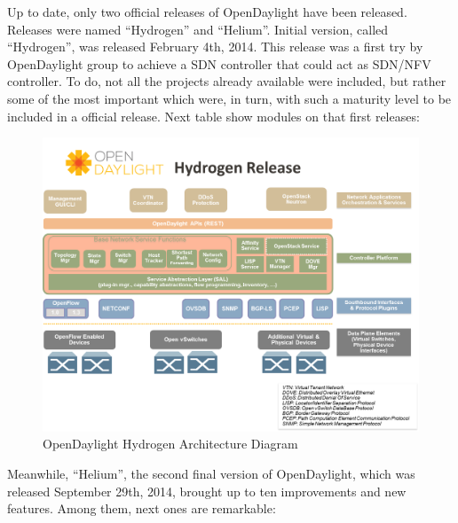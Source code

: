 \documentclass[a4paper, 12pt]{book}
\begin{document}
Up to date, only two official releases of OpenDaylight have been released. Releases were named ``Hydrogen'' and ``Helium''. Initial version, called ``Hydrogen'', was released February 4th, 2014. This release was a first try by OpenDaylight group to achieve a SDN controller that could act as SDN/NFV controller. To do, not all the projects already available were included, but rather some of the most important which were, in turn, with such a maturity level to be included in a official release. Next table show modules on that first releases:
\begin{center}
 \begin{figure}[H]
 \begin{center}
   \includegraphics[width=15cm]{img/odl-technologies-00.png}
   \caption{OpenDaylight Hydrogen Architecture Diagram}
   \label{fig:odl_tech_diagram}
 \end{center}
 \end{figure}
\end{center}
Meanwhile, ``Helium'', the second final version of OpenDaylight, which was released September 29th, 2014, brought up to ten improvements and new features. Among them, next ones are remarkable:
\end{document}
